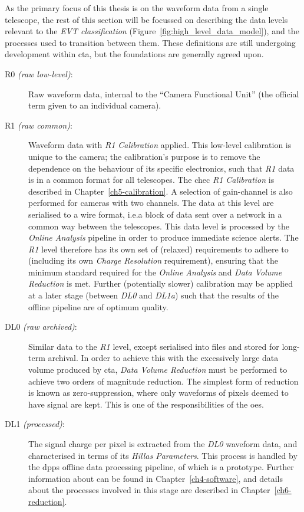 As the primary focus of this thesis is on the waveform data from a single telescope, the rest of this section will be focussed on describing the data levels relevant to the \textit{EVT classification} (Figure~\ref{fig:high_level_data_model}), and the processes used to transition between them. These definitions are still undergoing development within \gls{cta}, but the foundations are generally agreed upon.
\begin{description}
\item[R0 \textit{(raw low-level)}:]
Raw waveform data, internal to the ``Camera Functional Unit'' (the official term given to an individual camera).
\item[R1 \textit{(raw common)}:]
Waveform data with \textit{R1 Calibration} applied. This low-level calibration is unique to the camera; the calibration's purpose is to remove the dependence on the behaviour of its specific electronics, such that \textit{R1} data is in a common format for all telescopes. The \gls{chec} \textit{R1 Calibration} is described in Chapter~\ref{ch5-calibration}. A selection of gain-channel is also performed for cameras with two channels. The data at this level are serialised to a wire format, i.e.\@ a block of data sent over a network in a common way between the telescopes. This data level is processed by the \textit{Online Analysis} pipeline in order to produce immediate science alerts. The \textit{R1} level therefore has its own set of (relaxed) requirements to adhere to (including its own \textit{Charge Resolution} requirement), ensuring that the minimum standard required for the \textit{Online Analysis} and \textit{Data Volume Reduction} is met. Further (potentially slower) calibration may be applied at a later stage (between \textit{DL0} and \textit{DL1a}) such that the results of the offline pipeline are of optimum quality. 
\item[DL0 \textit{(raw archived)}:]
Similar data to the \textit{R1} level, except serialised into files and stored for long-term archival. In order to achieve this with the excessively large data volume produced by \gls{cta}, \textit{Data Volume Reduction} must be performed to achieve two orders of magnitude reduction. The simplest form of reduction is known as zero-suppression, where only waveforms of pixels deemed to have signal are kept. This is one of the responsibilities of the \gls{oes}.
\item[DL1 \textit{(processed)}:]
The signal charge per pixel is extracted from the \textit{DL0} waveform data, and characterised in terms of its \textit{Hillas Parameters}. This process is handled by the \gls{dpps} offline data processing pipeline, of which  is a prototype. Further information about  can be found in Chapter~\ref{ch4-software}, and details about the processes involved in this stage are described in Chapter~\ref{ch6-reduction}.

\end{description}

